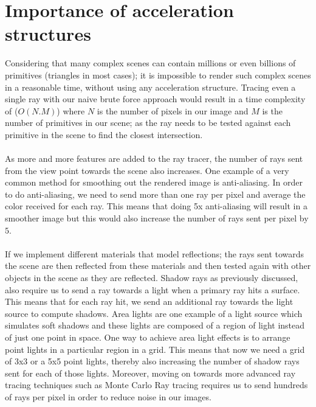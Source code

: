 \documentclass[11pt,a4paper]{article}
\begin{document}
\section{Importance of acceleration structures}
Considering that many complex scenes can contain millions or even billions of primitives (triangles in most cases); it is impossible to render such complex scenes in a reasonable time, without using any acceleration structure. Tracing even a single ray with our naive brute force approach would result in a time complexity of ($O(N.M)$) where $N$ is the number of pixels in our image and $M$ is the number of primitives in our scene; as the ray needs to be tested against each primitive in the scene to find the closest intersection. 
\\~\\
\noindent
As more and more features are added to the ray tracer, the number of rays sent from the view point towards the scene also increases. One example of a very common method for smoothing out the rendered image is anti-aliasing. In order to do anti-aliasing, we need to send more than one ray per pixel and average the color received for each ray. This means that doing 5x anti-aliasing will result in a smoother image but this would also increase the number of rays sent per pixel by $5$. 
\\~\\
\noindent
If we implement different materials that model reflections; the rays sent towards the scene are then reflected from these materials and then tested again with other objects in the scene as they are reflected. Shadow rays as previously discussed, also require us to send a ray towards a light when a primary ray hits a surface. This means that for each ray hit, we send an additional ray towards the light source to compute shadows. Area lights are one example of a light source which simulates soft shadows and these lights are composed of a region of light instead of just one point in space. One way to achieve area light effects is to arrange point lights in a particular region in a grid. This means that now we need a grid of 3x3 or a 5x5 point lights, thereby also increasing the number of shadow rays sent for each of those lights. Moreover, moving on towards more advanced ray tracing techniques such as Monte Carlo Ray tracing requires us to send hundreds of rays per pixel in order to reduce noise in our images.
\\~\\
\noindent
\end{document}

